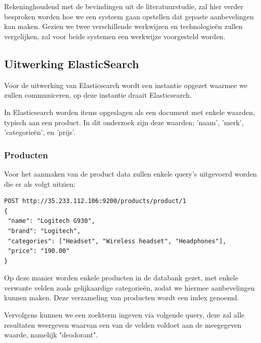 

\chapter{}
\label{ch:methodologie}


Rekeninghoudend met de bevindingen uit de literatuurstudie, zal hier verder besproken worden hoe we een systeem gaan opstellen dat gepaste aanbevelingen kan maken. Gezien we twee verschillende werkwijzen en technologieën zullen vergelijken, zal voor beide systemen een werkwijze voorgesteld worden.

\section{Uitwerking ElasticSearch}
\label{sec:Uitwerking ElasticSearch}

Voor de uitwerking van Elasticsearch wordt een instantie opgezet waarmee we zullen communiceren, op deze instantie draait Elasticsearch. 

In Elasticsearch worden items opgeslagen als een document met enkele waarden, typisch aan een product. In dit onderzoek zijn deze waarden; 'naam', 'merk', 'categorieën', en 'prijs'. 

\subsection{Producten}
\label{sec:Producten}
Voor het aanmaken van de product data zullen enkele query's uitgevoerd worden die er als volgt uitzien:

\begin{lstlisting}[caption={Query om één enkel product aan te maken},captionpos=b]
POST http://35.233.112.106:9200/products/product/1 
{ 
 "name": "Logitech G930",
 "brand": "Logitech",
 "categories": ["Headset", "Wireless headset", "Headphones"],
 "price": "190.00"
}
\end{lstlisting}

Op deze manier worden enkele producten in de databank gezet, met enkele verwante velden zoals gelijkaardige categorieën, zodat we hiermee aanbevelingen kunnen maken. Deze verzameling van producten wordt een index genoemd.

Vervolgens kunnen we een zoekterm ingeven via volgende query, deze zal alle resultaten weergeven waarvan een van de velden voldoet aan de meegegeven waarde, namelijk "deodorant". 

